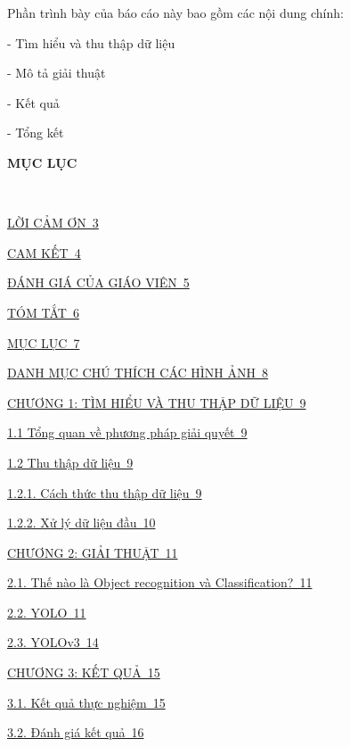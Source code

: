 \documentclass{report}
\begin{document}
Phần trình bày của báo cáo này bao gồm các nội dung chính:

\setlength{\parindent}{2.5cm}
- Tìm hiểu và thu thập dữ liệu

- Mô tả giải thuật

- Kết quả

- Tổng kết

\newpage
\changefontsizes{16pt}
\centerline{\textbf{MỤC LỤC}}\

\vspace{1.2cm}
\changefontsizes{14pt}
\setlength{\parindent}{0cm}
\hyperlink{page.3}{LỜI CẢM ƠN\dotfill\ 3}

\smallskip
\hyperlink{page.4}{CAM KẾT\dotfill\ 4}

\smallskip
\hyperlink{page.5}{ĐÁNH GIÁ CỦA GIÁO VIÊN\dotfill\ 5}

\smallskip
\hyperlink{page.6}{TÓM TẮT\dotfill\ 6}

\smallskip
\hyperlink{page.7}{MỤC LỤC\dotfill\ 7}

\smallskip
\hyperlink{page.8}{DANH MỤC CHÚ THÍCH CÁC HÌNH ẢNH\dotfill\ 8}

\smallskip
\setlength{\parindent}{0.0cm}
\hyperlink{page.9}{CHƯƠNG 1: TÌM HIỂU VÀ THU THẬP DỮ LIỆU\dotfill\ 9}

\setlength{\parindent}{0.5cm}
\hyperlink{page.9}{1.1 Tổng quan về phương pháp giải quyết\dotfill\ 9}

\hyperlink{page.9}{1.2 Thu thập dữ liệu\dotfill\ 9}

\setlength{\parindent}{1cm}
\hyperlink{page.9}{1.2.1. Cách thức thu thập dữ liệu\dotfill\ 9}

\hyperlink{page.10}{1.2.2. Xử lý dữ liệu đầu\dotfill\ 10}



\smallskip
\setlength{\parindent}{0.0cm}
\hyperlink{page.11}{CHƯƠNG 2: GIẢI THUẬT\dotfill\ 11}

\setlength{\parindent}{0.5cm}

\hyperlink{page.11}{2.1. Thế nào là Object recognition và Classification?\dotfill\ 11}

	
\hyperlink{page.11}{2.2. YOLO\dotfill\ 11}


\hyperlink{page.14}{2.3. YOLOv3\dotfill\ 14}


\smallskip
\setlength{\parindent}{0.0cm}
\hyperlink{page.15}{CHƯƠNG 3: KẾT QUẢ\dotfill\ 15}

\setlength{\parindent}{0.5cm}
\hyperlink{page.15}{3.1. Kết quả thực nghiệm\dotfill\ 15}

\setlength{\parindent}{0.5cm}
\hyperlink{page.16}{3.2. Đánh giá kết quả\dotfill\ 16}
\end{document}
